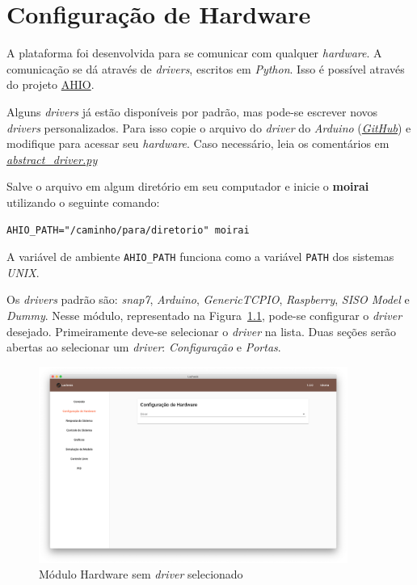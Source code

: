
\chapter{Configuração de Hardware}%
\label{chapter:hardware-configuration}

A plataforma foi desenvolvida para se comunicar com qualquer \textit{hardware}.
A comunicação se dá através de \textit{drivers}, escritos em \textit{Python}.
Isso é possível através do projeto
\href{https://github.com/acristoffers/ahio}{AHIO}.

Alguns \textit{drivers} já estão disponíveis por padrão, mas pode-se escrever
novos \textit{drivers} personalizados. Para isso copie o arquivo do
\textit{driver} do \textit{Arduino}
(\href{https://github.com/acristoffers/ahio/blob/master/ahio/drivers/arduino.py}{\textit{GitHub}})
e modifique para acessar seu \textit{hardware}. Caso necessário, leia os
comentários em
\href{https://github.com/acristoffers/ahio/blob/master/ahio/abstract_driver.py}{\textit{abstract\_driver.py}}

Salve o arquivo em algum diretório em seu computador e inicie o \textbf{moirai}
utilizando o seguinte comando:

\texttt{AHIO_PATH="/caminho/para/diretorio" moirai}

A variável de ambiente \texttt{AHIO_PATH} funciona como a variável
\texttt{PATH} dos sistemas \textit{UNIX}.

Os \textit{drivers} padrão são: \textit{snap7}, \textit{Arduino},
\textit{GenericTCPIO}, \textit{Raspberry}, \textit{SISO Model} e \textit{Dummy}.
Nesse módulo, representado na Figura~\ref{fig:hardware1}, pode-se configurar o
\textit{driver} desejado. Primeiramente deve-se selecionar o \textit{driver} na
lista. Duas seções serão abertas ao selecionar um \textit{driver}:
\textit{Configuração} e \textit{Portas}.

\begin{figure}[ht!]
    \centering
    \includegraphics[width=0.9\textwidth]{imgs/hardware}
    \caption[Módulo Hardware sem driver selecionado]{Módulo Hardware sem \textit{driver} selecionado}%
    \label{fig:hardware1}
\end{figure}


